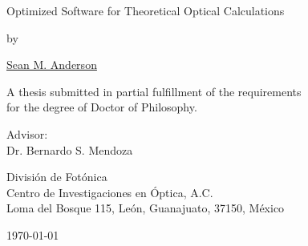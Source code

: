 \begin{titlepage}
\begin{center}
{\Huge Optimized Software for Theoretical Optical Calculations}
\vspace{1.0cm}

{\large by}
\vspace{1.0cm}

{\LARGE \href{mailto:sean.martin.anderson@gmail.com}{Sean M. Anderson}}
\vspace{3cm}

{\Large A thesis submitted in partial fulfillment of the requirements\\
\vspace{0.25cm}
for the degree of Doctor of Philosophy.}
\vspace{4cm}

{\large Advisor:\\
Dr. Bernardo S. Mendoza
\vspace*{1cm}

Divisi\'on de Fot\'onica\\
Centro de Investigaciones en \'Optica, A.C.\\
Loma del Bosque 115, Le\'on, Guanajuato, 37150, M\'exico}
\vfill
\today
\end{center}
\end{titlepage}

